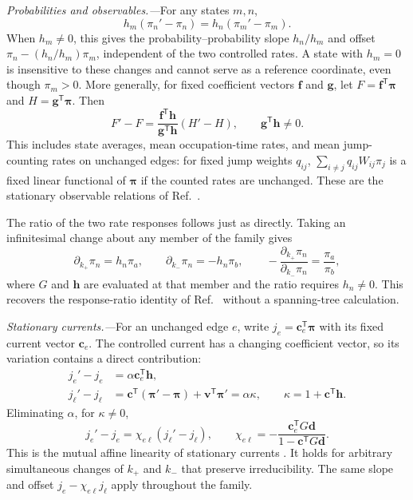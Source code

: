 \documentclass[
  reprint,
  superscriptaddress,
  amsmath,
  amssymb,
  aps,
  pre,
  longbibliography
]{revtex4-2}
\begin{document}
\textit{Probabilities and observables.---}For any states $m,n$,
\begin{equation}
 h_m(\pi_n'-\pi_n)=h_n(\pi_m'-\pi_m).
 \label{eq:probabilities}
\end{equation}
When $h_m\ne0$, this gives the probability--probability slope
$h_n/h_m$ and offset $\pi_n-(h_n/h_m)\pi_m$, independent of the
two controlled rates. A state with $h_m=0$ is insensitive to these
changes and cannot serve as a reference coordinate, even though
$\pi_m>0$. More generally, for fixed coefficient vectors $\bm f$
and $\bm g$, let $F=\bm f^{\mathsf T}\bm\pi$ and
$H=\bm g^{\mathsf T}\bm\pi$. Then
\begin{equation}
 F'-F=\frac{\bm f^{\mathsf T}\bm h}
                 {\bm g^{\mathsf T}\bm h}(H'-H),
 \qquad \bm g^{\mathsf T}\bm h\ne0.
 \label{eq:observables}
\end{equation}
This includes state averages, mean occupation-time rates, and mean
jump-counting rates on unchanged edges: for fixed jump weights
$q_{ij}$, $\sum_{i\ne j}q_{ij}W_{ij}\pi_j$ is a fixed linear
functional of $\bm\pi$ if the counted rates are unchanged.
These are the stationary observable relations of
Ref.~\cite{BebonSpeck2026}.

The ratio of the two rate responses follows just as directly.
Taking an infinitesimal change about any member of the family gives
\begin{equation}
 \partial_{k_+}\pi_n=h_n\pi_a,\qquad
 \partial_{k_-}\pi_n=-h_n\pi_b,
 \qquad
 -\frac{\partial_{k_+}\pi_n}{\partial_{k_-}\pi_n}
 =\frac{\pi_a}{\pi_b},
 \label{eq:response-ratio}
\end{equation}
where $G$ and $\bm h$ are evaluated at that member and the ratio
requires $h_n\ne0$. This recovers the response-ratio identity of
Ref.~\cite{BebonSpeck2026} without a spanning-tree calculation.

\textit{Stationary currents.---}For an unchanged edge $e$, write
$j_e=\bm c_e^{\mathsf T}\bm\pi$ with its fixed current vector
$\bm c_e$. The controlled current has a changing coefficient vector,
so its variation contains a direct contribution:
\begin{align}
 j_e'-j_e&=\alpha\bm c_e^{\mathsf T}\bm h,
 \label{eq:output-current}\\
 j_\ell'-j_\ell
 &=\bm c^{\mathsf T}(\bm\pi'-\bm\pi)
   +\bm v^{\mathsf T}\bm\pi'
 =\alpha\kappa,
 \qquad \kappa=1+\bm c^{\mathsf T}\bm h.
 \label{eq:input-current}
\end{align}
Eliminating $\alpha$, for $\kappa\ne0$,
\begin{equation}
 \boxed{j_e'-j_e=\chi_{e\ell}(j_\ell'-j_\ell),\qquad
 \chi_{e\ell}=
 -\frac{\bm c_e^{\mathsf T}G\bm d}
        {1-\bm c^{\mathsf T}G\bm d}.}
 \label{eq:currents}
\end{equation}
This is the mutual affine linearity of stationary currents
\cite{Harunari2024}. It holds for arbitrary simultaneous changes of
$k_+$ and $k_-$ that preserve irreducibility. The same slope and
offset $j_e-\chi_{e\ell}j_\ell$ apply throughout the family.
\end{document}
